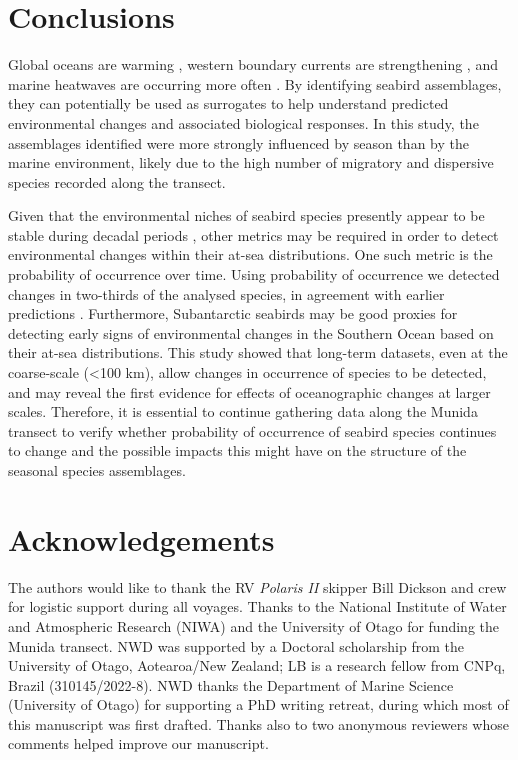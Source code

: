 \documentclass[preprint, 3p, authoryear]{elsarticle} %
\begin{document}
\hypertarget{conclusions}{%
\section{Conclusions}\label{conclusions}}

Global oceans are warming \citep{cheng2022}, western boundary currents are strengthening \citep{yang2016}, and marine heatwaves are occurring more often \citep{oliver2018}. By identifying seabird assemblages, they can potentially be used as surrogates to help understand predicted environmental changes and associated biological responses. In this study, the assemblages identified were more strongly influenced by season than by the marine environment, likely due to the high number of migratory and dispersive species recorded along the transect.

Given that the environmental niches of seabird species presently appear to be stable during decadal periods \citep{lambert2018, lambert2022}, other metrics may be required in order to detect environmental changes within their at-sea distributions. One such metric is the probability of occurrence over time. Using probability of occurrence we detected changes in two-thirds of the analysed species, in agreement with earlier predictions \citep{kruger2018}. Furthermore, Subantarctic seabirds may be good proxies for detecting early signs of environmental changes in the Southern Ocean based on their at-sea distributions. This study showed that long-term datasets, even at the coarse-scale (\textless100 km), allow changes in occurrence of species to be detected, and may reveal the first evidence for effects of oceanographic changes at larger scales. Therefore, it is essential to continue gathering data along the Munida transect to verify whether probability of occurrence of seabird species continues to change and the possible impacts this might have on the structure of the seasonal species assemblages.

\hypertarget{acknowledgements}{%
\section*{Acknowledgements}\label{acknowledgements}}

The authors would like to thank the RV \emph{Polaris II} skipper Bill Dickson and crew for logistic support during all voyages. Thanks to the National Institute of Water and Atmospheric Research (NIWA) and the University of Otago for funding the Munida transect. NWD was supported by a Doctoral scholarship from the University of Otago, Aotearoa/New Zealand; LB is a research fellow from CNPq, Brazil (310145/2022-8). NWD thanks the Department of Marine Science (University of Otago) for supporting a PhD writing retreat, during which most of this manuscript was first drafted. Thanks also to two anonymous reviewers whose comments helped improve our manuscript.
\end{document}
